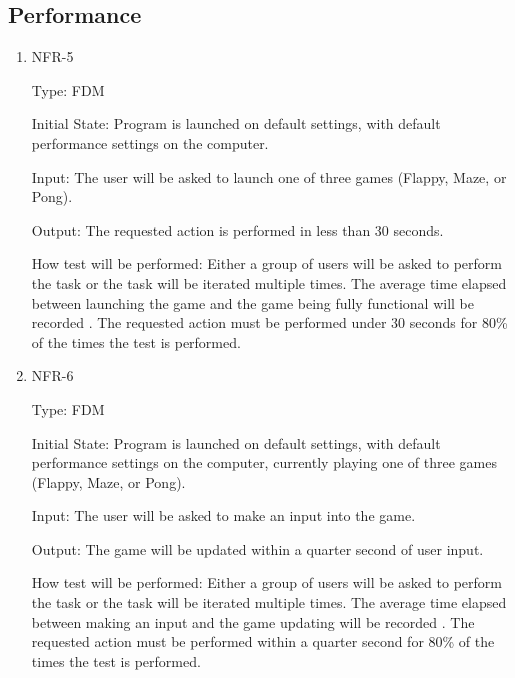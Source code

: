 \documentclass[12pt, titlepage]{article}
\begin{document}
\subsection{Performance}
\begin{enumerate}
\item{NFR-5\\}

Type: FDM
					
Initial State: Program is launched on default settings, with default performance settings on the computer. 
					
Input: The user will be asked to launch one of three games (Flappy, Maze, or Pong).
					
Output: The requested action is performed in less than 30 seconds.

How test will be performed: Either a group of users will be asked to perform the task or the task will be iterated multiple times. The average time elapsed between launching the game and the game being fully functional will be recorded . The requested action must be performed under 30 seconds for 80\%  of the times the test is performed.

\item{NFR-6\\}

Type: FDM
					
Initial State: Program is launched on default settings, with default performance settings on the computer, currently playing one of three games (Flappy, Maze, or Pong).
					
Input: The user will be asked to make an input into the game.
					
Output: The game will be updated within a quarter second of user input.

How test will be performed: Either a group of users will be asked to perform the task or the task will be iterated multiple times. The average time elapsed between making an input and the game updating will be recorded . The requested action must be performed within a quarter second for 80\%  of the times the test is performed.
\end{enumerate}
\end{document}
